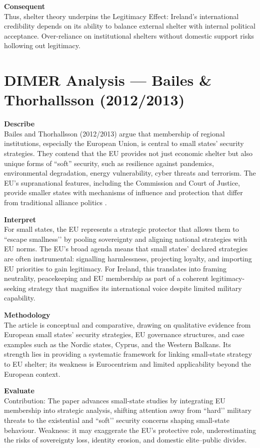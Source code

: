 \textbf{Consequent} \\
Thus, shelter theory underpins the Legitimacy Effect: Ireland’s international credibility depends on its ability to balance external shelter with internal political acceptance. Over-reliance on institutional shelters without domestic support risks hollowing out legitimacy.  

\section*{DIMER Analysis — Bailes \& Thorhallsson (2012/2013)}

\textbf{Describe} \\
Bailes and Thorhallsson (2012/2013) argue that membership of regional institutions, especially the European Union, is central to small states’ security strategies. They contend that the EU provides not just economic shelter but also unique forms of ``soft'' security, such as resilience against pandemics, environmental degradation, energy vulnerability, cyber threats and terrorism. The EU’s supranational features, including the Commission and Court of Justice, provide smaller states with mechanisms of influence and protection that differ from traditional alliance politics \parencite{BAILES_2012}.  

\textbf{Interpret} \\
For small states, the EU represents a strategic protector that allows them to ``escape smallness’’ by pooling sovereignty and aligning national strategies with EU norms. The EU’s broad agenda means that small states’ declared strategies are often instrumental: signalling harmlessness, projecting loyalty, and importing EU priorities to gain legitimacy. For Ireland, this translates into framing neutrality, peacekeeping and EU membership as part of a coherent legitimacy-seeking strategy that magnifies its international voice despite limited military capability.

\textbf{Methodology} \\
The article is conceptual and comparative, drawing on qualitative evidence from European small states’ security strategies, EU governance structures, and case examples such as the Nordic states, Cyprus, and the Western Balkans. Its strength lies in providing a systematic framework for linking small-state strategy to EU shelter; its weakness is Eurocentrism and limited applicability beyond the European context.

\textbf{Evaluate} \\
Contribution: The paper advances small-state studies by integrating EU membership into strategic analysis, shifting attention away from ``hard’’ military threats to the existential and ``soft’’ security concerns shaping small-state behaviour. Weakness: it may exaggerate the EU’s protective role, underestimating the risks of sovereignty loss, identity erosion, and domestic elite–public divides.  

